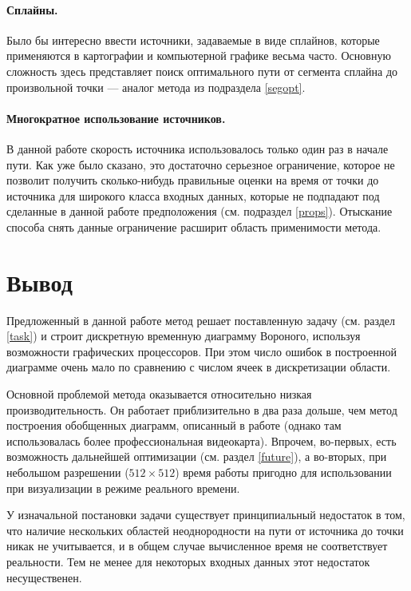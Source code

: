 \documentclass[12pt]{article}
\begin{document}
\paragraph{Сплайны.} Было бы интересно ввести источники, задаваемые в виде сплайнов,
которые применяются в картографии и компьютерной графике весьма часто. 
Основную сложность здесь представляет поиск оптимального пути от сегмента 
сплайна до произвольной точки --- аналог метода из подраздела \ref{segopt}.

\paragraph{Многократное использование источников.} В данной работе скорость
источника использовалось только один раз в начале пути.
Как уже было сказано, это достаточно серьезное ограничение, которое не позволит 
получить сколько-нибудь правильные оценки на время от точки до источника
для широкого класса входных данных, которые не подпадают под 
сделанные в данной работе предположения (см. подраздел \ref{props}). Отыскание способа
снять данные ограничение расширит область применимости метода.

\section{Вывод}
Предложенный в данной работе метод решает поставленную задачу (см. раздел \ref{task})
и строит дискретную временную диаграмму Вороного, используя возможности графических
процессоров. При этом число ошибок в построенной диаграмме очень мало по 
сравнению с числом ячеек в дискретизации области. 

Основной проблемой метода оказывается относительно низкая производительность. 
Он работает приблизительно в два раза дольше, чем метод построения обобщенных диаграмм, 
описанный в работе \cite{gvd} (однако там использовалась более профессиональная видеокарта). 
Впрочем, во-первых, есть возможность дальнейшей оптимизации
(см. раздел \ref{future}), а во-вторых, при небольшом разрешении ($512\times512$)
время работы пригодно для использовании при визуализации в режиме
реального времени.

У изначальной постановки задачи существует принципиальный недостаток в том, 
что наличие нескольких областей неоднородности на пути от источника до точки
никак не учитывается, и в общем случае вычисленное время не соответствует 
реальности. Тем не менее для некоторых входных данных этот недостаток несущественен.
\end{document}
